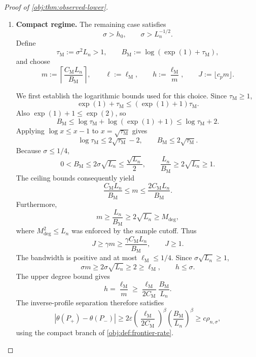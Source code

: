 \begin{proof}[Proof of \cref{obj:thm:observed-lower}]
\begin{enumerate}
For the Gaussian tail parameter,
\[
\lambda=\frac{\ell^2}{\sigma^2}=a_{\mathrm I}^2m,
\qquad
2\lambda\le\gamma m\le J,
\]
and the radius calibration gives
\[
\frac{\exp(1)\lambda}{J}
\le\frac{\exp(1)a_{\mathrm I}^2}{\gamma}
\le\exp(-1/\gamma).
\]
Consequently,
\[
\mathcal T_{\sigma,\ell,J}
\le2\exp(-J/\gamma)\le2\exp(-m).
\]
Since \(m\ge S_{\mathrm I}\),
\[
N_{\mathrm I}\exp(-m)
\le
N_{\mathrm I}\exp(-S_{\mathrm I})
=
\frac{N_{\mathrm I}}{\exp(1)+N_{\mathrm I}}
\le1.
\]
Using \(h\le\sigma\) and \(d>0\), we obtain the complete sample-factor bound
\[
\begin{aligned}
n\sigma^{-\kappa-1}h^{2\beta+2\kappa+2}
\mathcal T_{\sigma,\ell,J}
&\le2n\sigma^d\exp(-m)\\
&=2N_{\mathrm I}\exp(-m)\le2.
\end{aligned}
\]
Hence
\[
n\chi^2(Q_\pm,Q_\star)
\le2B_{\mathrm I}\varepsilon^2
\le\log(1+\tau^2).
\]
The product comparison established above proves
\[
\operatorname{TV}(Q_{P_+}^n,Q_{P_-}^n)\le\tau.
\]

\item \textbf{Compact regime.}
The remaining case satisfies
\[
\sigma>h_0,\qquad \sigma>L_n^{-1/2}.
\]
Define
\[
\tau_{\mathrm M}:=\sigma^2L_n>1,\qquad
B_{\mathrm M}:=\log(\exp(1)+\tau_{\mathrm M}),
\]
and choose
\[
m:=\left\lceil\frac{C_{\mathrm M}L_n}{B_{\mathrm M}}\right\rceil,
\qquad
\ell:=\ell_{\mathrm M},\qquad
h:=\frac{\ell_{\mathrm M}}m,\qquad
J:=\lfloor c_pm\rfloor.
\]

We first establish the logarithmic bounds used for this choice. Since
\(\tau_{\mathrm M}\ge1\),
\[
\exp(1)+\tau_{\mathrm M}
\le(\exp(1)+1)\tau_{\mathrm M}.
\]
Also \(\exp(1)+1\le\exp(2)\), so
\[
B_{\mathrm M}
\le\log\tau_{\mathrm M}+\log(\exp(1)+1)
\le\log\tau_{\mathrm M}+2.
\]
Applying \(\log x\le x-1\) to \(x=\sqrt{\tau_{\mathrm M}}\) gives
\[
\log\tau_{\mathrm M}\le2\sqrt{\tau_{\mathrm M}}-2,
\qquad
B_{\mathrm M}\le2\sqrt{\tau_{\mathrm M}}.
\]
Because \(\sigma\le1/4\),
\[
0<B_{\mathrm M}
\le2\sigma\sqrt{L_n}
\le\frac{\sqrt{L_n}}2,
\qquad
\frac{L_n}{B_{\mathrm M}}\ge2\sqrt{L_n}\ge1.
\]
The ceiling bounds consequently yield
\[
\frac{C_{\mathrm M}L_n}{B_{\mathrm M}}
\le m\le\frac{2C_{\mathrm M}L_n}{B_{\mathrm M}}.
\]
Furthermore,
\[
m\ge\frac{L_n}{B_{\mathrm M}}
\ge2\sqrt{L_n}\ge M_{\mathrm{deg}},
\]
where \(M_{\mathrm{deg}}^2\le L_n\) was enforced by the sample cutoff. Thus
\[
J\ge\gamma m\ge
\frac{\gamma C_{\mathrm M}L_n}{B_{\mathrm M}},
\qquad J\ge1.
\]
The bandwidth is positive and at most \(\ell_{\mathrm M}\le1/4\). Since
\(\sigma\sqrt{L_n}\ge1\),
\[
\sigma m\ge2\sigma\sqrt{L_n}\ge2\ge\ell_{\mathrm M},
\qquad h\le\sigma.
\]
The upper degree bound gives
\[
h=\frac{\ell_{\mathrm M}}m
\ge
\frac{\ell_{\mathrm M}}{2C_{\mathrm M}}\frac{B_{\mathrm M}}{L_n}.
\]
The inverse-profile separation therefore satisfies
\[
|\theta(P_+)-\theta(P_-)|
\ge
2\varepsilon
\left(\frac{\ell_{\mathrm M}}{2C_{\mathrm M}}\right)^\beta
\left(\frac{B_{\mathrm M}}{L_n}\right)^\beta
\ge c\rho_{n,\sigma},
\]
using the compact branch of \cref{obj:def:frontier-rate}.


\end{enumerate}
\end{proof}
